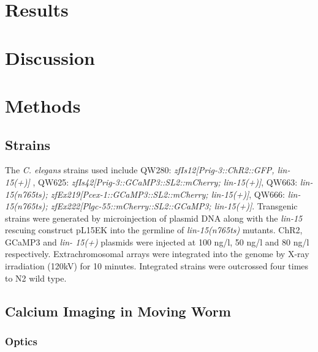 \section{Results}

\section{Discussion}

\section{Methods}

\subsection{Strains}
The \textit{C. elegans} strains used include QW280: \textit{zfIs12[Prig-3::ChR2::GFP, lin-15(+)]}
, QW625: \textit{zfIs42[Prig-3::GCaMP3::SL2::mCherry; lin-15(+)]}, QW663: \textit{lin-15(n765ts); zfEx219[Pcex-1::GCaMP3::SL2::mCherry; lin-15(+)]}, QW666: \textit{lin-15(n765ts);
zfEx222[Plgc-55::mCherry::SL2::GCaMP3; lin-15(+)]}. Transgenic strains were
generated by microinjection of plasmid DNA along with the \textit{lin-15} rescuing construct
pL15EK into the germline of \textit{lin-15(n765ts)} mutants. ChR2, GCaMP3 and \textit{lin-
15(+)} plasmids were injected at 100 ng/\textmu l, 50 ng/\textmu l and 80 ng/\textmu l respectively.
Extrachromosomal arrays were integrated into the genome by X-ray irradiation (120kV)
for 10 minutes. Integrated strains were outcrossed four times to N2 wild type.

\subsection{Calcium Imaging in Moving Worm}
\subsubsection{Optics}\label{sec:omegaOptics}

